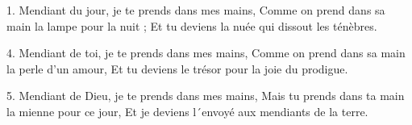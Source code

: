 1.
Mendiant du jour, je te prends dans mes mains,
Comme on prend dans sa main la lampe pour la nuit ;
Et tu deviens la nuée qui dissout les ténèbres.
%
%

4.
Mendiant de toi, je te prends dans mes mains,
Comme on prend dans sa main la perle d'un amour,
Et tu deviens le trésor pour la joie du prodigue.

5.
Mendiant de Dieu, je te prends dans mes mains,
Mais tu prends dans ta main la mienne pour ce jour,
Et je deviens l´envoyé aux mendiants de la terre. 
